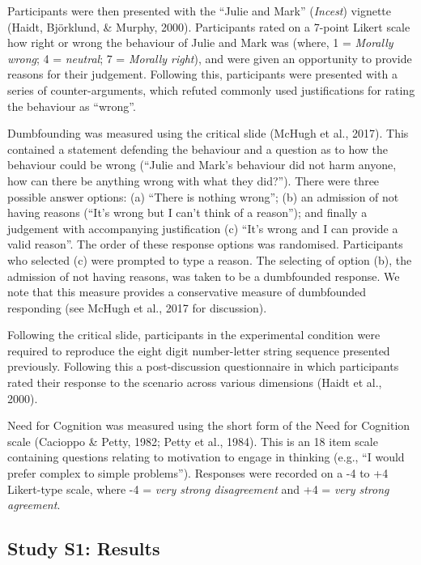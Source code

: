 \documentclass[
  man,floatsintext]{apa6}
\begin{document}
Participants were then presented with the ``Julie and Mark'' (\emph{Incest}) vignette (Haidt, Björklund, \& Murphy, 2000). Participants rated on a 7-point Likert scale how right or wrong the behaviour of Julie and Mark was (where, 1 = \emph{Morally wrong}; 4 = \emph{neutral}; 7 = \emph{Morally right}), and were given an opportunity to provide reasons for their judgement. Following this, participants were presented with a series of counter-arguments, which refuted commonly used justifications for rating the behaviour as ``wrong''.

Dumbfounding was measured using the critical slide (McHugh et al., 2017). This contained a statement defending the behaviour and a question as to how the behaviour could be wrong (``Julie and Mark's behaviour did not harm anyone, how can there be anything wrong with what they did?''). There were three possible answer options: (a) ``There is nothing wrong''; (b) an admission of not having reasons (``It's wrong but I can't think of a reason''); and finally a judgement with accompanying justification (c) ``It's wrong and I can provide a valid reason''. The order of these response options was randomised. Participants who selected (c) were prompted to type a reason. The selecting of option (b), the admission of not having reasons, was taken to be a dumbfounded response. We note that this measure provides a conservative measure of dumbfounded responding (see McHugh et al., 2017 for discussion).

Following the critical slide, participants in the experimental condition were required to reproduce the eight digit number-letter string sequence presented previously. Following this a post-discussion questionnaire in which participants rated their response to the scenario across various dimensions (Haidt et al., 2000).

Need for Cognition was measured using the short form of the Need for Cognition scale (Cacioppo \& Petty, 1982; Petty et al., 1984). This is an 18 item scale containing questions relating to motivation to engage in thinking (e.g., ``I would prefer complex to simple problems''). Responses were recorded on a -4 to +4 Likert-type scale, where -4 = \emph{very strong disagreement} and +4 = \emph{very strong agreement}.

\hypertarget{study-s1-results}{%
\subsection{Study S1: Results}\label{study-s1-results}}
\end{document}
